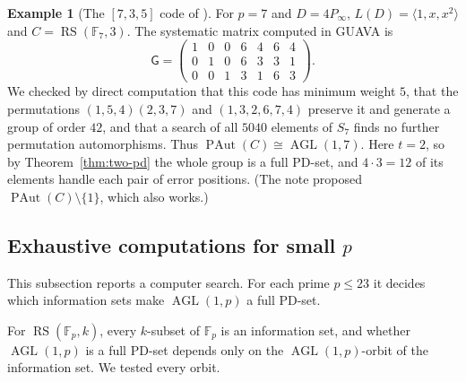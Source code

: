\documentclass[12pt,letterpaper]{article}
\theoremstyle{definition}
\newtheorem{example}[theorem]{Example}
\theoremstyle{remark}
\numberwithin{equation}{section}
\newcommand{\F}{\mathbb{F}}
\newcommand{\RS}{\operatorname{RS}}
\newcommand{\PAut}{\operatorname{PAut}}
\newcommand{\AGL}{\operatorname{AGL}}
\newcommand{\Gsys}{\mathsf{G}}
\begin{document}
\begin{example}[{The $[7,3,5]$ code of \cite{Jo05}}]\label{ex:7-3-5}
For $p=7$ and $D=4P_\infty$, $L(D)=\langle1,x,x^2\rangle$ and
$C=\RS(\F_7,3)$.  The systematic matrix computed in GUAVA \cite{Jo05} is
\[
\Gsys=\begin{pmatrix}
1&0&0&6&4&6&4\\
0&1&0&6&3&3&1\\
0&0&1&3&1&6&3
\end{pmatrix}.
\]
We checked by direct computation that this code has minimum weight $5$,
that the permutations $(1,5,4)(2,3,7)$ and $(1,3,2,6,7,4)$ preserve it
and generate a group of order $42$, and that a search of all $5040$
elements of $S_7$ finds no further permutation automorphisms.  Thus
$\PAut(C)\cong\AGL(1,7)$.  Here $t=2$, so by Theorem~\ref{thm:two-pd} the
whole group is a full PD-set, and $4\cdot3=12$ of its elements handle
each pair of error positions.  (The note \cite{Jo05} proposed
$\PAut(C)\setminus\{1\}$, which also works.)
\end{example}

\subsection{\texorpdfstring{Exhaustive computations for small $p$}{Exhaustive computations for small p}}

This subsection reports a computer search. For each prime $p\le23$ it
decides which information sets make $\AGL(1,p)$ a full PD-set.

For $\RS(\F_p,k)$, every $k$-subset of $\F_p$ is an information set, and
whether $\AGL(1,p)$ is a full PD-set depends only on the
$\AGL(1,p)$-orbit of the information set.  We tested every orbit.
\end{document}
